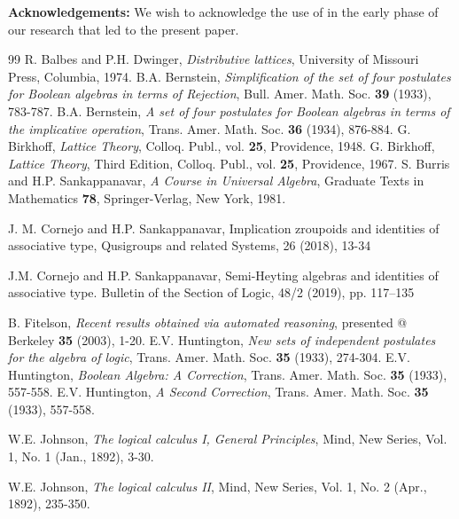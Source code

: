 \documentclass{amsart}
\theoremstyle{plain}
\theoremstyle{problem}
\theoremstyle{definition}
\theoremstyle{remark}
\numberwithin{equation}{section}
\begin{document}
{\bf Acknowledgements:}  We wish to acknowledge the use of \cite{Mc09} in the early phase of our research that led to the present paper.


\medskip
\begin{thebibliography}{99}
   R. Balbes and P.H. Dwinger, \emph{Distributive lattices}, University of
   Missouri Press, Columbia, 1974.
   B.A. Bernstein, \emph{Simplification of the set of four postulates for Boolean algebras in terms of Rejection},
    Bull. Amer. Math. Soc. \textbf{39} (1933), 783-787.
   B.A. Bernstein, \emph{A set of four postulates for Boolean algebras in terms of the implicative operation},
    Trans. Amer. Math. Soc. \textbf{36} (1934), 876-884.
   G. Birkhoff, \emph{Lattice Theory}, Colloq. Publ.,
    vol. \textbf{25}, Providence, 1948.
   G. Birkhoff, \emph{Lattice Theory}, Third Edition, Colloq. Publ.,
    vol. \textbf{25}, Providence, 1967.
   S. Burris and H.P. Sankappanavar, \emph{A Course in Universal Algebra},
    Graduate Texts in Mathematics \textbf{78}, Springer-Verlag, New York, 1981.
 
          J. M. Cornejo and H.P. Sankappanavar, Implication zroupoids and identities of associative type,  
	 Qusigroups and related Systems, 26 (2018), 13-34 

          J.M.  Cornejo and H.P. Sankappanavar, Semi-Heyting algebras and identities of associative type.  
           Bulletin of the Section of Logic, 48/2 (2019), pp. 117–135

   B. Fitelson, \emph{Recent results obtained via automated reasoning}, presented @ Berkeley \textbf{35} (2003), 1-20.
   E.V. Huntington, \emph{New sets of independent postulates for the algebra of logic}, Trans. Amer. Math. Soc. \textbf{35} (1933), 274-304.
   E.V. Huntington, \emph{Boolean Algebra: A Correction}, Trans. Amer. Math. Soc. \textbf{35} (1933), 557-558.
   E.V. Huntington, \emph{A Second Correction}, Trans. Amer. Math. Soc. \textbf{35} (1933), 557-558.
   
   W.E. Johnson, \emph{The logical calculus I, General Principles}, Mind, New Series, Vol. 1, No. 1 (Jan., 1892), 3-30.   %
   
  W.E. Johnson, \emph{The logical calculus II},
   Mind, New Series, Vol. 1, No. 2 (Apr., 1892), 235-350.
   

\end{thebibliography}
\end{document}
